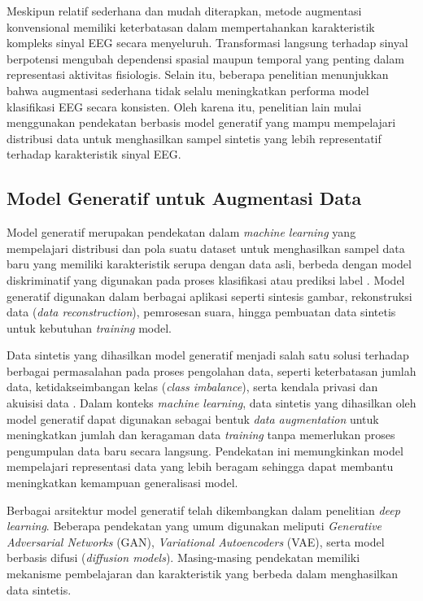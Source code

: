Meskipun relatif sederhana dan mudah diterapkan, metode augmentasi konvensional memiliki keterbatasan dalam mempertahankan karakteristik kompleks sinyal EEG secara menyeluruh. Transformasi langsung terhadap sinyal berpotensi mengubah dependensi spasial maupun temporal yang penting dalam representasi aktivitas fisiologis. Selain itu, beberapa penelitian menunjukkan bahwa augmentasi sederhana tidak selalu meningkatkan performa model klasifikasi EEG secara konsisten. Oleh karena itu, penelitian lain mulai menggunakan pendekatan berbasis model generatif yang mampu mempelajari distribusi data untuk menghasilkan sampel sintetis yang lebih representatif terhadap karakteristik sinyal EEG.

\subsection{Model Generatif untuk Augmentasi Data}
\label{sec:model_generatif}

Model generatif merupakan pendekatan dalam \textit{machine learning} yang mempelajari distribusi dan pola suatu dataset untuk menghasilkan sampel data baru yang memiliki karakteristik serupa dengan data asli, berbeda dengan model diskriminatif yang digunakan pada proses klasifikasi atau prediksi label \cite{generative_models_survey}. Model generatif digunakan dalam berbagai aplikasi seperti sintesis gambar, rekonstruksi data (\textit{data reconstruction}), pemrosesan suara, hingga pembuatan data sintetis untuk kebutuhan \textit{training} model.

Data sintetis yang dihasilkan model generatif menjadi salah satu solusi terhadap berbagai permasalahan pada proses pengolahan data, seperti keterbatasan jumlah data, ketidakseimbangan kelas (\textit{class imbalance}), serta kendala privasi dan akuisisi data \cite{generative_models_survey}. Dalam konteks \textit{machine learning}, data sintetis yang dihasilkan oleh model generatif dapat digunakan sebagai bentuk \textit{data augmentation} untuk meningkatkan jumlah dan keragaman data \textit{training} tanpa memerlukan proses pengumpulan data baru secara langsung. Pendekatan ini memungkinkan model mempelajari representasi data yang lebih beragam sehingga dapat membantu meningkatkan kemampuan generalisasi model.

Berbagai arsitektur model generatif telah dikembangkan dalam penelitian \textit{deep learning}. Beberapa pendekatan yang umum digunakan meliputi \textit{Generative Adversarial Networks} (GAN), \textit{Variational Autoencoders} (VAE), serta model berbasis difusi (\textit{diffusion models}). Masing-masing pendekatan memiliki mekanisme pembelajaran dan karakteristik yang berbeda dalam menghasilkan data sintetis.

